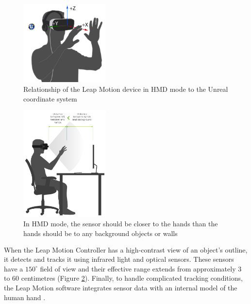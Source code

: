 \begin{figure}[!htb]
\includegraphics[width=0.4\textwidth]{figures/unrealAxes.png}
\centering
\caption{Relationship of the Leap Motion device in HMD mode to the Unreal coordinate system \cite{ULTP}}
\label{fig:unrealAxes}
\end{figure}

\begin{figure}[!htb]
\includegraphics[width=0.4\textwidth]{figures/HMDistance.png}
\centering
\caption{In HMD mode, the sensor should be closer to the hands than the hands should be to any background objects or walls \cite{ULTP}}
\label{fig:HMDistance}
\end{figure}

When the Leap Motion Controller has a high-contrast view of an object's outline, it detects and tracks it using infrared light and optical sensors. These sensors have a $150^\circ$ field of view and their effective range extends from approximately 3 to 60 centimetres (Figure \ref{fig:HMDistance}). Finally, to handle complicated tracking conditions, the Leap Motion software integrates sensor data with an internal model of the human hand \cite{ULTP}.

